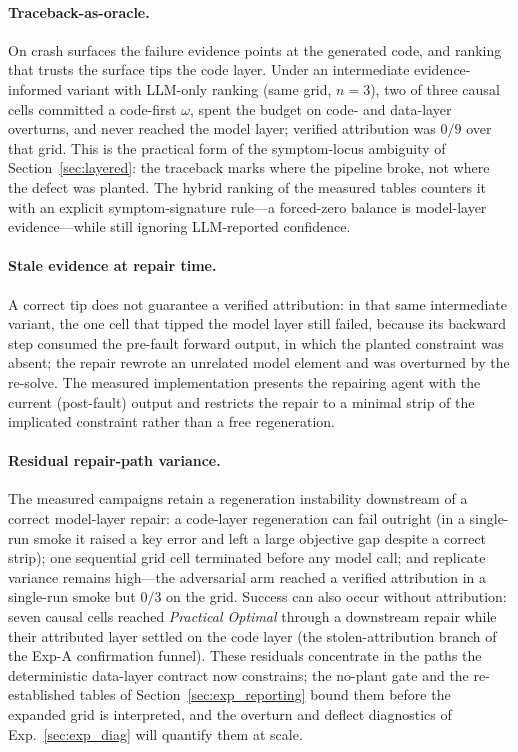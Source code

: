 \documentclass[a4paper,fleqn]{cas-sc}
\begin{document}
\paragraph{Traceback-as-oracle.}
On crash surfaces the failure evidence points at the generated code, and
ranking that trusts the surface tips the code layer. Under an
intermediate evidence-informed variant with LLM-only ranking (same grid,
$n{=}3$), two of three causal cells committed a code-first $\omega$, spent
the budget on code- and data-layer overturns, and never reached the model
layer; verified attribution was $0/9$ over that grid. This is the
practical form of the symptom-locus ambiguity of
Section~\ref{sec:layered}: the traceback marks where the pipeline broke,
not where the defect was planted. The hybrid ranking of the measured
tables counters it with an explicit symptom-signature rule---a
forced-zero balance is model-layer evidence---while still ignoring
LLM-reported confidence.

\paragraph{Stale evidence at repair time.}
A correct tip does not guarantee a verified attribution: in that same
intermediate variant, the one cell that tipped the model layer still
failed, because its backward step consumed the pre-fault forward output,
in which the planted constraint was absent; the repair rewrote an
unrelated model element and was overturned by the re-solve. The measured
implementation presents the repairing agent with the current (post-fault)
output and restricts the repair to a minimal strip of the implicated
constraint rather than a free regeneration.

\paragraph{Residual repair-path variance.}
The measured campaigns retain a regeneration instability downstream of a
correct model-layer repair: a code-layer regeneration can fail outright
(in a single-run smoke it raised a key error and left a large objective
gap despite a correct strip); one sequential grid cell terminated before
any model call; and replicate variance remains high---the adversarial arm
reached a verified attribution in a single-run smoke but $0/3$ on the
grid. Success can also occur without attribution: seven causal cells
reached \emph{Practical Optimal} through a downstream repair while their
attributed layer settled on the code layer (the stolen-attribution branch
of the Exp-A confirmation funnel). These residuals concentrate in the paths
the deterministic data-layer contract now constrains; the no-plant gate
and the re-established tables of Section~\ref{sec:exp_reporting} bound
them before the expanded grid is interpreted, and the overturn and
deflect diagnostics of Exp.~\ref{sec:exp_diag} will quantify them at
scale.
\end{document}
